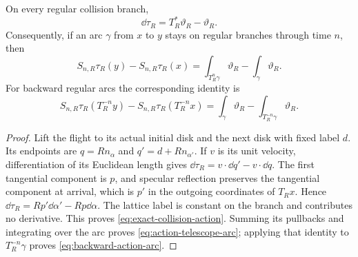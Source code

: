 \begin{lemma}
\label{lem:exact-collision-action}
On every regular collision branch,
\begin{equation}\label{eq:exact-collision-action}
 \dd\tau_R=T_R^*\vartheta_R-\vartheta_R.
\end{equation}
Consequently, if an arc $\gamma$ from $x$ to $y$ stays on regular
branches through time $n$, then
\begin{equation}\label{eq:action-telescope-arc}
 S_{n,R}\tau_R(y)-S_{n,R}\tau_R(x)
       =\int_{T_R^n\gamma}\vartheta_R-\int_\gamma\vartheta_R.
\end{equation}
For backward regular arcs the corresponding identity is
\begin{equation}\label{eq:backward-action-arc}
 S_{n,R}\tau_R(T_R^{-n}y)-S_{n,R}\tau_R(T_R^{-n}x)
       =\int_\gamma\vartheta_R-\int_{T_R^{-n}\gamma}\vartheta_R.
\end{equation}
\end{lemma}
\begin{proof}
Lift the flight to its actual initial disk and the next disk with fixed
label $d$. Its endpoints are $q=Rn_\alpha$ and
$q'=d+Rn_{\alpha'}$. If $v$ is its unit velocity, differentiation of
its Euclidean length gives
$\dd\tau_R=v\cdot\dd q'-v\cdot\dd q$.
The first tangential component is $p$, and specular reflection preserves
the tangential component at arrival, which is $p'$ in the outgoing
coordinates of $T_Rx$. Hence
$\dd\tau_R=Rp'\dd\alpha'-Rp\dd\alpha$. The lattice label is constant
on the branch and contributes no derivative. This proves
\eqref{eq:exact-collision-action}. Summing its pullbacks and integrating
over the arc proves \eqref{eq:action-telescope-arc}; applying that
identity to $T_R^{-n}\gamma$ proves \eqref{eq:backward-action-arc}.
\end{proof}

